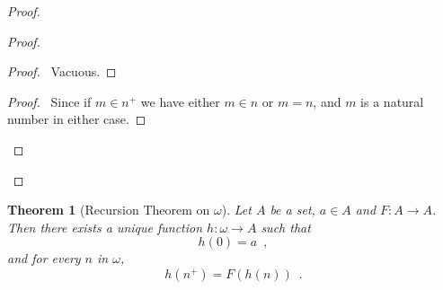 \documentclass{article}
\let\qed\relax
\newtheorem{theorem}[axiom]{Theorem}
\theoremstyle{definition}
\begin{document}
    \begin{proof}
        \pf
        \begin{proof}
            \begin{proof}
                \pf\ Vacuous.
            \end{proof}
            \begin{proof}
                \pf\ Since if $m \in n^+$ we have either $m \in n$ or $m = n$, and $m$ is a natural number
                in either case.
            \end{proof}
        \end{proof}
        \qed
    \end{proof}

    \begin{theorem}[Recursion Theorem on $\omega$]
        Let $A$ be a set, $a \in A$ and $F : A \rightarrow A$. Then there exists a unique function
        $h : \omega \rightarrow A$ such that
        \[ h(0) = a \enspace , \]
        and for every $n$ in $\omega$,
        \[ h(n^+) = F(h(n)) \enspace . \]
    \end{theorem}
\end{document}
